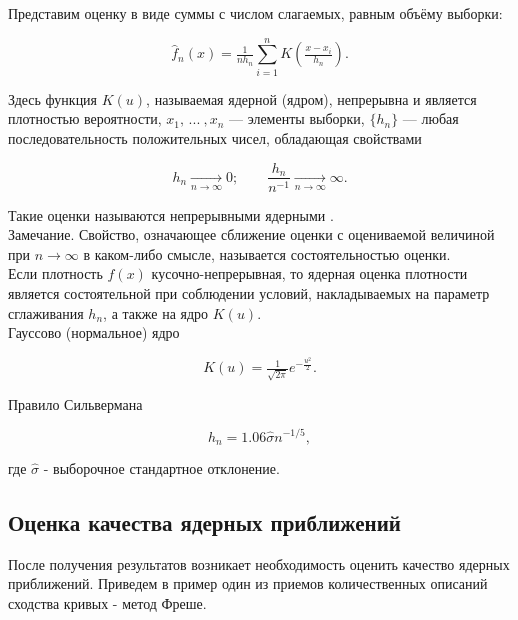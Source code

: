 \documentclass{article}
\begin{document}
Представим оценку в виде суммы с числом слагаемых, равным объёму выборки:

\begin{equation}
    \widehat{f}_n(x) = \tfrac{1}{nh_n}\sum\limits_{i=1}^n K\left( \tfrac{x - x_i}{h_n} \right).
\end{equation}

Здесь функция $K(u)$, называемая ядерной (ядром), непрерывна и является плотностью вероятности, $x_1, \, ... \: , x_n$ --- элементы выборки, $\{h_n\}$ --- любая последовательность положительных чисел, обладающая свойствами

\begin{equation}
    h_n \underset{n \to \infty}{\longrightarrow} 0; \qquad \dfrac{h_n}{n^{-1}} \underset{n \to \infty}{\longrightarrow} \infty.
\end{equation}

Такие оценки называются непрерывными ядерными \cite[с. 421-423]{b:probSectMath}.\\

Замечание. Свойство, означающее сближение оценки с оцениваемой величиной при $n \rightarrow \infty$ в каком-либо смысле, называется состоятельностью оценки.\\

Если плотность $f(x)$ кусочно-непрерывная, то ядерная оценка плотности является состоятельной при соблюдении условий, накладываемых на параметр сглаживания $h_n$, а также на ядро $K(u)$.\\

Гауссово (нормальное) ядро \cite[с. 38]{a:nonParamRegr}

\begin{equation}
    K(u) = \tfrac{1}{\sqrt{2\pi}}e^{-\tfrac{u^2}{2}}.
\end{equation}

Правило Сильвермана \cite[с. 44]{a:nonParamRegr}

\begin{equation}
    h_n = 1.06\hat{\sigma}n^{-1/5},
\end{equation}

где $\hat{\sigma}$ - выборочное стандартное отклонение.

\subsection{Оценка качества ядерных приближений}

После получения результатов возникает необходимость оценить качество ядерных приближений. Приведем в пример один из приемов количественных описаний сходства кривых - метод Фреше. \\
\end{document}
